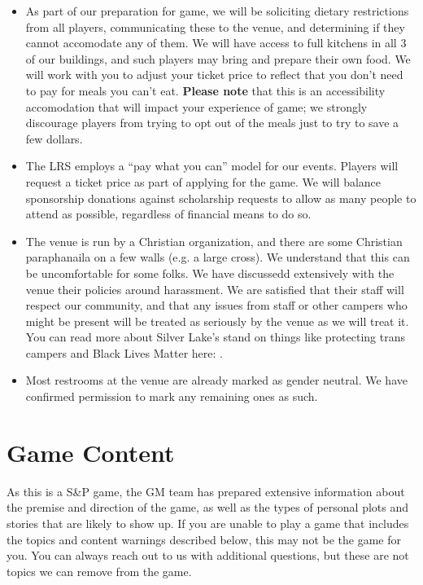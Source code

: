 \documentclass[sheet]{PP}
\begin{document}
\begin{itemize}
  \item As part of our preparation for game, we will be soliciting dietary restrictions from all players, communicating these to the venue, and determining if they cannot accomodate any of them. We will have access to full kitchens in all 3 of our buildings, and such players may bring and prepare their own food. We will work with you to adjust your ticket price to reflect that you don't need to pay for meals you can't eat. \textbf{Please note} that this is an accessibility accomodation that will impact your experience of game; we strongly discourage players from trying to opt out of the meals just to try to save a few dollars.
  \item The LRS employs a ``pay what you can'' model for our events. Players will request a ticket price as part of applying for the game. We will balance sponsorship donations against scholarship requests to allow as many people to attend as possible, regardless of financial means to do so.
  \item The venue is run by a Christian organization, and there are some Christian paraphanaila on a few walls (e.g. a large cross). We understand that this can be uncomfortable for some folks. We have discussedd extensively with the venue their policies around harassment. We are satisfied that their staff will respect our community, and that any issues from staff or other campers who might be present will be treated as seriously by the venue as we will treat it. You can read more about Silver Lake's stand on things like protecting trans campers and Black Lives Matter here: \url{}.
  \item Most restrooms at the venue are already marked as gender neutral. We have confirmed permission to mark any remaining ones as such.
\end{itemize}

\section{Game Content}
As this is a S\&P game, the GM team has prepared extensive information about the premise and direction of the game, as well as the types of personal plots and stories that are likely to show up. If you are unable to play a game that includes the topics and content warnings described below, this may not be the game for you. You can always reach out to us with additional questions, but these are not topics we can remove from the game.
\end{document}
